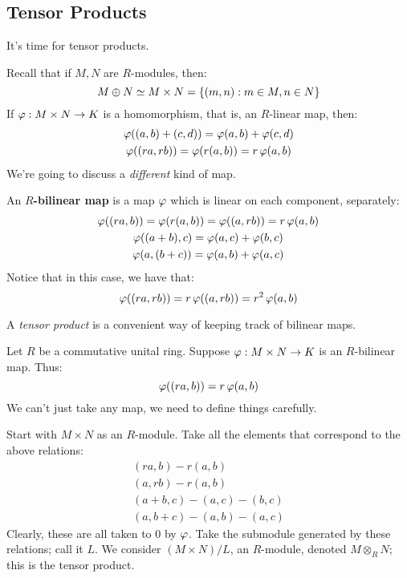 \newpage %
\subsection{Tensor Products}

It's time for tensor products.

Recall that if $ M, N $ are $ R $-modules, then:
\begin{equation*}
    M \oplus N \simeq M \times N = \left\{{(m, n) : m \in M, n \in N}\right\}
\end{equation*}
If $ \operatorname{\varphi} : M \times N \rightarrow K $ is a homomorphism, that is, an $ R $-linear map,
then:
\begin{gather*}
    \operatorname{\varphi}((a, b) + (c, d)) = \operatorname{\varphi}(a, b) + \operatorname{\varphi}(c, d) \\
    \operatorname{\varphi}((ra, rb)) = \operatorname{\varphi}(r(a, b)) = r\operatorname{\varphi}(a, b)
\end{gather*}
We're going to discuss a \textit{different} kind of map.

\begin{defn}
    An $ R $\textbf{-bilinear map} is a map $ \operatorname{\varphi} $ which is linear on each
    component, separately:
    \begin{gather*}
        \operatorname{\varphi}((ra, b)) = \operatorname{\varphi}(r(a,b)) = \operatorname{\varphi}((a,rb)) = r\operatorname{\varphi}(a, b) \\
        \operatorname{\varphi}((a+b), c) = \operatorname{\varphi}(a,c) + \operatorname{\varphi}(b, c) \\
        \operatorname{\varphi}(a, (b+c)) = \operatorname{\varphi}(a,b) + \operatorname{\varphi}(a,c)
    \end{gather*}
    Notice that in this case, we have that:
    \begin{equation*}
        \operatorname{\varphi}((ra, rb)) = r\operatorname{\varphi}((a, rb)) = r^{2}\operatorname{\varphi}(a, b)
    \end{equation*}
\end{defn}
A \textit{tensor product} is a convenient way of keeping track of bilinear maps.

Let $ R $ be a commutative unital ring.
Suppose $ \operatorname{\varphi}: M \times N \rightarrow K $ is an $ R $-bilinear map. Thus:
\begin{equation*}
    \operatorname{\varphi}((ra, b)) = r\operatorname{\varphi}(a, b)
\end{equation*}
We can't just take any map, we need to define things carefully.

Start with $ M \times N $ as an $ R $-module.
Take all the elements that correspond to the above relations:
\begin{gather*}
    (ra, b) - r(a, b) \\
    (a, rb) - r(a, b) \\
    (a+b,c) - (a,c) - (b,c) \\
    (a,b+c) - (a,b) - (a,c)
\end{gather*}
Clearly, these are all taken to $ 0 $ by $ \operatorname{\varphi} $.
Take the submodule generated by these relations; call it $ L $.
We consider $ (M \times N)/L $, an $ R $-module, denoted $ M \otimes_{R}N $;
this is the tensor product.

